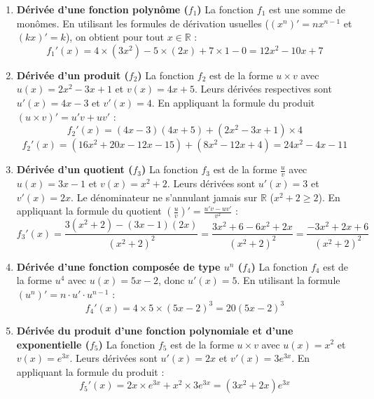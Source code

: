 \documentclass[11pt,a4paper]{article}
\begin{document}
\begin{enumerate}
  \item \textbf{Dérivée d'une fonction polynôme ($f_1$)}  
  La fonction $f_1$ est une somme de monômes. En utilisant les formules de dérivation usuelles ($(x^n)' = n x^{n-1}$ et $(kx)' = k$), on obtient pour tout $x \in \mathbb{R}$ :
  $$f_1'(x) = 4 \times (3x^2) - 5 \times (2x) + 7 \times 1 - 0 = 12x^2 - 10x + 7$$

  \item \textbf{Dérivée d'un produit ($f_2$)}  
  La fonction $f_2$ est de la forme $u \times v$ avec $u(x) = 2x^2 - 3x + 1$ et $v(x) = 4x + 5$.  
  Leurs dérivées respectives sont $u'(x) = 4x - 3$ et $v'(x) = 4$.  
  En appliquant la formule du produit $(u \times v)' = u'v + uv'$ :
  $$f_2'(x) = (4x - 3)(4x + 5) + (2x^2 - 3x + 1) \times 4$$
  $$f_2'(x) = (16x^2 + 20x - 12x - 15) + (8x^2 - 12x + 4) = 24x^2 - 4x - 11$$

  \item \textbf{Dérivée d'un quotient ($f_3$)}  
  La fonction $f_3$ est de la forme $\frac{u}{v}$ avec $u(x) = 3x - 1$ et $v(x) = x^2 + 2$.  
  Leurs dérivées sont $u'(x) = 3$ et $v'(x) = 2x$. Le dénominateur ne s'annulant jamais sur $\mathbb{R}$ ($x^2 + 2 \ge 2$).  
  En appliquant la formule du quotient $\left(\frac{u}{v}\right)' = \frac{u'v - uv'}{v^2}$ :
  $$f_3'(x) = \frac{3(x^2 + 2) - (3x - 1)(2x)}{(x^2 + 2)^2} = \frac{3x^2 + 6 - 6x^2 + 2x}{(x^2 + 2)^2} = \frac{-3x^2 + 2x + 6}{(x^2 + 2)^2}$$

  \item \textbf{Dérivée d'une fonction composée de type $u^n$ ($f_4$)}  
  La fonction $f_4$ est de la forme $u^4$ avec $u(x) = 5x - 2$, donc $u'(x) = 5$.  
  En utilisant la formule $(u^n)' = n \cdot u' \cdot u^{n-1}$ :
  $$f_4'(x) = 4 \times 5 \times (5x - 2)^3 = 20(5x - 2)^3$$

  \item \textbf{Dérivée du produit d'une fonction polynomiale et d'une exponentielle ($f_5$)}  
  La fonction $f_5$ est de la forme $u \times v$ avec $u(x) = x^2$ et $v(x) = e^{3x}$.  
  Leurs dérivées sont $u'(x) = 2x$ et $v'(x) = 3e^{3x}$.  
  En appliquant la formule du produit :
  $$f_5'(x) = 2x \times e^{3x} + x^2 \times 3e^{3x} = (3x^2 + 2x)e^{3x}$$
\end{enumerate}
\end{document}
